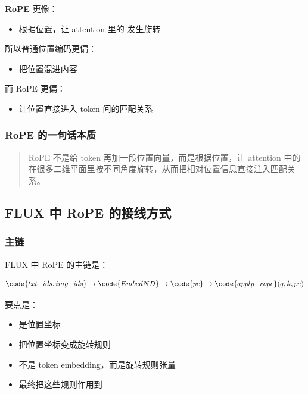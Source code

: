 \textbf{RoPE} 更像：
\begin{itemize}[leftmargin=1.5em]
  \item 根据位置，让 attention 里的  发生旋转
\end{itemize}

所以普通位置编码更偏：
\begin{itemize}[leftmargin=1.5em]
  \item 把位置混进内容
\end{itemize}

而 RoPE 更偏：
\begin{itemize}[leftmargin=1.5em]
  \item 让位置直接进入 token 间的匹配关系
\end{itemize}

\subsubsection{RoPE 的一句话本质}

\begin{quote}
RoPE 不是给 token 再加一段位置向量，而是根据位置，让 attention 中的  在很多二维平面里按不同角度旋转，从而把相对位置信息直接注入匹配关系。
\end{quote}

\subsection{FLUX 中 RoPE 的接线方式}

\subsubsection{主链}

FLUX 中 RoPE 的主链是：

\[
\code{txt\_ids, img\_ids} \rightarrow \code{EmbedND} \rightarrow \code{pe} \rightarrow \code{apply\_rope}(q, k, pe)
\]

要点是：

\begin{itemize}[leftmargin=1.5em]
  \item {} 是位置坐标
  \item {} 把位置坐标变成旋转规则
  \item {} 不是 token embedding，而是旋转规则张量
  \item {} 最终把这些规则作用到 
\end{itemize}

